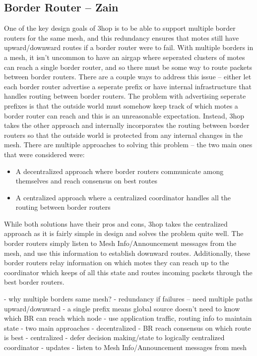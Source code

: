 \subsection{Border Router -- Zain}
One of the key design goals of 3hop is to be able to support multiple border routers for the same mesh, and this redundancy ensures that motes still have upward/downward routes if a border router were to fail.
With multiple borders in a mesh, it isn't uncommon to have an airgap where seperated clusters of motes can reach a single border router, and so there must be some way to route packets between border routers.
There are a couple ways to address this issue -- either let each border router advertise a seperate prefix or have internal infrastructure that handles routing between border routers.
The problem with advertising seperate prefixes is that the outside world must somehow keep track of which motes a border router can reach and this is an unreasonable expectation.
Instead, 3hop takes the other approach and internally incorporates the routing between border routers so that the outside world is protected from any internal changes in the mesh.
There are multiple approaches to solving this problem -- the two main ones that were considered were:
\begin{itemize}
\item A decentralized approach where border routers communicate among themselves and reach consensus on best routes
\item A centralized approach where a centralized coordinator handles all the routing between border routers 
\end{itemize}
While both solutions have their pros and cons, 3hop takes the centralized approach as it is fairly simple in design and solves the problem quite well.
The border routers simply listen to Mesh Info/Announcement messages from the mesh, and use this information to establish downward routes.
Additionally, these border routers relay information on which motes they can reach up to the coordinator which keeps of all this state and routes incoming packets through the best border routers.


\if
- why multiple borders same mesh?
    - redundancy if failures -- need multiple paths upward/downward
    - a single prefix means global source doesn't need to know which BR can reach which node
    - use application traffic, routing info to maintain state
- two main approaches
    - decentralized
        - BR reach consensus on which route is best
    - centralized
        - defer decision making/state to logically centralized coordinator
- updates
    - listen to Mesh Info/Announcement messages from mesh
\fi



